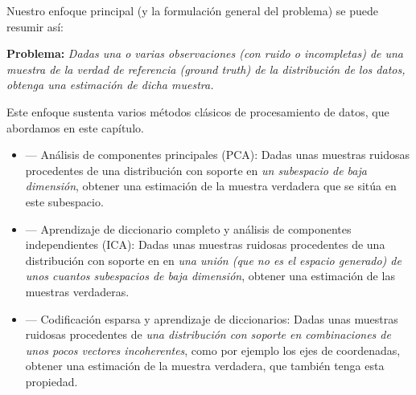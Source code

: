 \documentclass[../../book-main.tex]{subfiles}
\begin{document}
Nuestro enfoque principal (y la formulación general del problema) se puede resumir así:
\begin{tcolorbox}\centering
    \textbf{Problema:} \textit{Dadas una o varias observaciones (con ruido o
        incompletas) de una muestra de la verdad de referencia (\textit{ground truth}) de la distribución de los datos,
    obtenga una estimación de dicha muestra.}
\end{tcolorbox}
Este enfoque sustenta varios métodos clásicos de procesamiento de datos,
que abordamos en este capítulo.
\begin{itemize}
    \item {} --- Análisis de componentes principales (PCA):
        Dadas unas muestras ruidosas procedentes de una distribución con soporte en {\em un
        subespacio de baja dimensión}, obtener una estimación de la muestra verdadera
        que se sitúa en este subespacio.
    \item  {} ---  Aprendizaje de diccionario completo y 
        análisis de componentes independientes (ICA): Dadas unas muestras ruidosas
        procedentes de una distribución con soporte en en {\em una unión (que no
        es el espacio generado) de unos cuantos subespacios de baja dimensión}, obtener una
        estimación de las muestras verdaderas.
    \item {} --- Codificación esparsa y
        aprendizaje de diccionarios: Dadas unas muestras ruidosas procedentes de {\em una
            distribución con soporte en combinaciones de unos pocos vectores incoherentes}, 
        como por ejemplo los ejes de coordenadas, obtener una estimación de
        la muestra verdadera, que también tenga esta propiedad.
\end{itemize}
\end{document}
